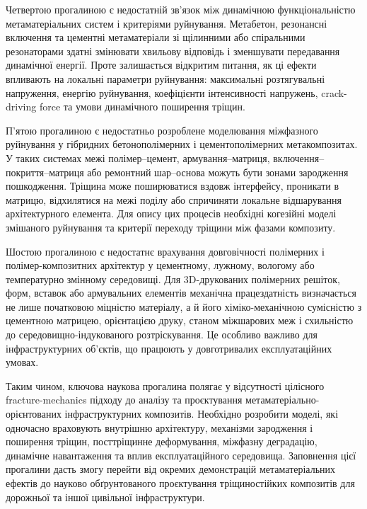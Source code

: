 \documentclass[12pt,a4paper]{article}
\begin{document}
Четвертою прогалиною є недостатній зв'язок між динамічною функціональністю метаматеріальних систем і критеріями руйнування. Метабетон, резонансні включення та цементні метаматеріали зі щілинними або спіральними резонаторами здатні змінювати хвильову відповідь і зменшувати передавання динамічної енергії. Проте залишається відкритим питання, як ці ефекти впливають на локальні параметри руйнування: максимальні розтягувальні напруження, енергію руйнування, коефіцієнти інтенсивності напружень, crack-driving force та умови динамічного поширення тріщин.

П'ятою прогалиною є недостатньо розроблене моделювання міжфазного руйнування у гібридних бетонополімерних і цементополімерних метакомпозитах. У таких системах межі полімер--цемент, армування--матриця, включення--покриття--матриця або ремонтний шар--основа можуть бути зонами зародження пошкодження. Тріщина може поширюватися вздовж інтерфейсу, проникати в матрицю, відхилятися на межі поділу або спричиняти локальне відшарування архітектурного елемента. Для опису цих процесів необхідні когезійні моделі змішаного руйнування та критерії переходу тріщини між фазами композиту.

Шостою прогалиною є недостатнє врахування довговічності полімерних і полімер-композитних архітектур у цементному, лужному, вологому або температурно змінному середовищі. Для 3D-друкованих полімерних решіток, форм, вставок або армувальних елементів механічна працездатність визначається не лише початковою міцністю матеріалу, а й його хіміко-механічною сумісністю з цементною матрицею, орієнтацією друку, станом міжшарових меж і схильністю до середовищно-індукованого розтріскування. Це особливо важливо для інфраструктурних об'єктів, що працюють у довготривалих експлуатаційних умовах.

Таким чином, ключова наукова прогалина полягає у відсутності цілісного fracture-mechanics підходу до аналізу та проєктування метаматеріально-орієнтованих інфраструктурних композитів. Необхідно розробити моделі, які одночасно враховують внутрішню архітектуру, механізми зародження і поширення тріщин, посттріщинне деформування, міжфазну деградацію, динамічне навантаження та вплив експлуатаційного середовища. Заповнення цієї прогалини дасть змогу перейти від окремих демонстрацій метаматеріальних ефектів до науково обґрунтованого проєктування тріщиностійких композитів для дорожньої та іншої цивільної інфраструктури.
\end{document}
